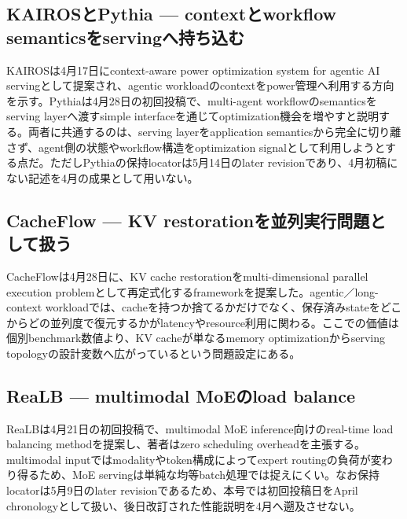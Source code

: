 \subsection{KAIROSとPythia — contextとworkflow semanticsをservingへ持ち込む}

KAIROSは4月17日にcontext-aware power optimization system for agentic AI servingとして提案され、agentic workloadのcontextをpower管理へ利用する方向を示す。Pythiaは4月28日の初回投稿で、multi-agent workflowのsemanticsをserving layerへ渡すsimple interfaceを通じてoptimization機会を増やすと説明する。両者に共通するのは、serving layerをapplication semanticsから完全に切り離さず、agent側の状態やworkflow構造をoptimization signalとして利用しようとする点だ。ただしPythiaの保持locatorは5月14日のlater revisionであり、4月初稿にない記述を4月の成果として用いない。\autocite{src-551442a9e215,src-d91793d0a6fa}


\subsection{CacheFlow — KV restorationを並列実行問題として扱う}

CacheFlowは4月28日に、KV cache restorationをmulti-dimensional parallel execution problemとして再定式化するframeworkを提案した。agentic／long-context workloadでは、cacheを持つか捨てるかだけでなく、保存済みstateをどこからどの並列度で復元するかがlatencyやresource利用に関わる。ここでの価値は個別benchmark数値より、KV cacheが単なるmemory optimizationからserving topologyの設計変数へ広がっているという問題設定にある。\autocite{src-0fc9d11483aa}


\subsection{ReaLB — multimodal MoEのload balance}

ReaLBは4月21日の初回投稿で、multimodal MoE inference向けのreal-time load balancing methodを提案し、著者はzero scheduling overheadを主張する。multimodal inputではmodalityやtoken構成によってexpert routingの負荷が変わり得るため、MoE servingは単純な均等batch処理では捉えにくい。なお保持locatorは5月9日のlater revisionであるため、本号では初回投稿日をApril chronologyとして扱い、後日改訂された性能説明を4月へ遡及させない。\autocite{src-2a6eae37bd39}



